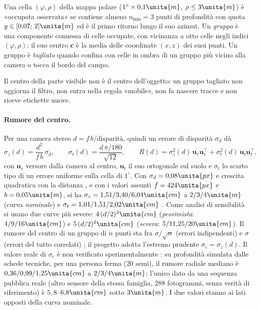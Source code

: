 \begin{definizione}\label{def:sti-gruppo}
Una cella $(\varphi,\rho)$ della mappa polare ($1^\circ\times0{,}1\unita{m}$, $\rho\le3\unita{m}$) è «occupata osservata» se contiene almeno $n_{\min}=3$ punti di profondità con quota $y\in[0{,}07;\,2]\unita{m}$ ed è il primo ritorno lungo il suo azimut. Un \emph{gruppo} è una componente connessa di celle occupate, con vicinanza a otto celle negli indici $(\varphi,\rho)$; il suo centro $\mathbf c$ è la media delle coordinate $(x,z)$ dei suoi punti. Un gruppo è \emph{tagliato} quando confina con celle in ombra di un gruppo più vicino alla camera o tocca il bordo del campo.
\end{definizione}
Il centro della parte visibile non è il centro dell'oggetto: un gruppo tagliato non aggiorna il filtro, non entra nella regola «mobile», non fa nascere tracce e non riceve etichette nuove.

\paragraph{Rumore del centro.} Per una camera stereo $d=f\,b/\text{disparità}$, quindi un errore di disparità $\sigma_d$ dà
\begin{equation}\label{eq:sti-sigmaz}
\sigma_z(d)=\frac{d^2}{f\,b}\,\sigma_d,\qquad
\sigma_t(d)=\frac{d\,\pi/180}{\sqrt{12}},\qquad
R(d)=\sigma_z^2(d)\,\mathbf u_r\mathbf u_r^{\top}+\sigma_t^2(d)\,\mathbf u_t\mathbf u_t^{\top},
\end{equation}
con $\mathbf u_r$ versore dalla camera al centro, $\mathbf u_t$ il suo ortogonale sul suolo e $\sigma_t$ lo scarto tipo di un errore uniforme sulla cella di $1^\circ$. Con $\sigma_d=0{,}08\unita{px}$ e crescita quadratica con la distanza \cite{realsense-taratura-profondita}, e con i valori assunti $f=424\unita{px}$ e $b=0{,}05\unita{m}$, si ha $\sigma_z=1{,}51/3{,}40/6{,}04\unita{cm}$ a $2/3/4\unita{m}$ (curva \emph{nominale}) e $\sigma_t=1{,}01/1{,}51/2{,}02\unita{cm}$ . Come analisi di sensibilità si usano due curve più severe: $4\,(d/2)^2\unita{cm}$ (\emph{pessimista}: $4/9/16\unita{cm}$) e $5\,(d/2)^2\unita{cm}$ (\emph{severa}: $5/11{,}25/20\unita{cm}$). Il rumore del centro di un gruppo di $n$ punti sta fra $\sigma/\sqrt n$ (errori indipendenti) e $\sigma$ (errori del tutto correlati) ; il progetto adotta l'estremo prudente $\sigma_c=\sigma_z(d)$. Il valore reale di $\sigma_c$ è non verificato sperimentalmente : su profondità simulata dalle schede tecniche, per una persona ferma (20 semi), il rumore radiale mediano è $0{,}36/0{,}99/1{,}25\unita{cm}$ a $2/3/4\unita{m}$; l'unico dato da una sequenza pubblica reale (altro sensore della stessa famiglia, 288 fotogrammi, senza verità di riferimento) è $5{,}8$--$6{,}8\unita{cm}$ sotto $3\unita{m}$. I due valori stanno ai lati opposti della curva nominale.

